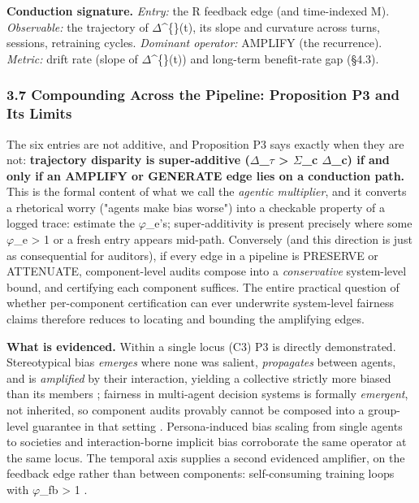 \documentclass[10pt]{article}
\begin{document}
\textbf{Conduction signature.} \emph{Entry:} the R feedback edge (and time-indexed M). \emph{Observable:} the trajectory of $\Delta$\textasciicircum\{\}(t), its slope and curvature across turns, sessions, retraining cycles. \emph{Dominant operator:} AMPLIFY (the recurrence). \emph{Metric:} drift rate (slope of $\Delta$\textasciicircum\{\}(t)) and long-term benefit-rate gap \cite{xu2024adapting} (\S{}4.3).

\subsubsection*{3.7 Compounding Across the Pipeline: Proposition P3 and Its Limits}

The six entries are not additive, and Proposition P3 says exactly when they are not: \textbf{trajectory disparity is super-additive ($\Delta$\_$\tau$ > $\Sigma$\_c $\Delta$\_c) if and only if an AMPLIFY or GENERATE edge lies on a conduction path.} This is the formal content of what we call the \emph{agentic multiplier}, and it converts a rhetorical worry ("agents make bias worse") into a checkable property of a logged trace: estimate the $\varphi$\_e's; super-additivity is present precisely where some $\varphi$\_e > 1 or a fresh entry appears mid-path. Conversely (and this direction is just as consequential for auditors), if every edge in a pipeline is PRESERVE or ATTENUATE, component-level audits compose into a \emph{conservative} system-level bound, and certifying each component suffices. The entire practical question of whether per-component certification can ever underwrite system-level fairness claims therefore reduces to locating and bounding the amplifying edges.

\textbf{What is evidenced.} Within a single locus (C3) P3 is directly demonstrated. Stereotypical bias \emph{emerges} where none was salient, \emph{propagates} between agents, and is \emph{amplified} by their interaction, yielding a collective strictly more biased than its members \cite{nguyen2025social}; fairness in multi-agent decision systems is formally \emph{emergent}, not inherited, so component audits provably cannot be composed into a group-level guarantee in that setting \cite{madigan2025emergent}. Persona-induced bias scaling from single agents to societies \cite{li2025from} and interaction-borne implicit bias \cite{borah2024implicit} corroborate the same operator at the same locus. The temporal axis supplies a second evidenced amplifier, on the feedback edge rather than between components: self-consuming training loops with $\varphi$\_fb > 1 \cite{wyllie2024fairness,wang2026observations,mansoury2020feedback}.
\end{document}
